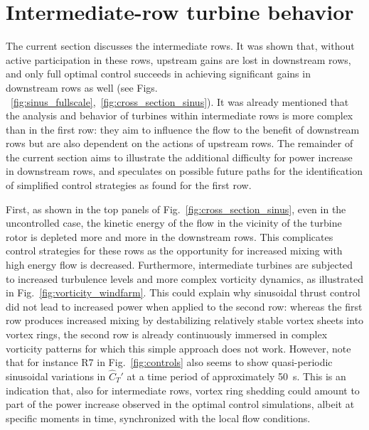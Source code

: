 \documentclass[wes, manuscript]{copernicus}
\begin{document}
\section{Intermediate-row turbine behavior}\label{sec:analysis_intermediate}
The current section discusses the intermediate rows. It was shown that, without active participation in these rows, upstream gains are lost in downstream rows, and only full optimal control succeeds in achieving significant gains in downstream rows as well (see Figs. ~\ref{fig:sinus_fullscale},~\ref{fig:cross_section_sinus}). It was already mentioned that the analysis and behavior of turbines within intermediate rows is more complex than in the first row: they aim to influence the flow to the benefit of downstream rows but are also dependent on the actions of upstream rows. The remainder of the current section aims to illustrate the additional difficulty for power increase in downstream rows, and speculates on possible future paths for the identification of simplified control strategies as found for the first row.

First, as shown in the top panels of Fig.~\ref{fig:cross_section_sinus}, even in the uncontrolled case, the kinetic energy of the flow in the vicinity of the turbine rotor is depleted more and more in the downstream rows. This complicates control strategies for these rows as the opportunity for increased mixing with high energy flow is decreased. Furthermore, intermediate turbines are subjected to increased turbulence levels and more complex vorticity dynamics, as illustrated in Fig.~\ref{fig:vorticity_windfarm}. This could explain why sinusoidal thrust control did not lead to increased power when applied to the second row: whereas the first row produces increased mixing by destabilizing relatively stable vortex sheets into vortex rings, the second row is already continuously immersed in complex vorticity patterns for which this simple approach does not work. 
However, note that for instance R7 in Fig.~\ref{fig:controls} also seems to show quasi-periodic sinusoidal variations in $\widehat{C}_{T}'$ at a time period of approximately 50~s. This is an indication that, also for intermediate rows, vortex ring shedding could amount to part of the power increase observed in the optimal control simulations, albeit at specific moments in time, synchronized with the local flow conditions.
\end{document}
